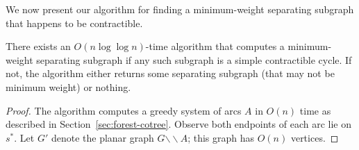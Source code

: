 \documentclass[letterpaper,review]{siamart190516}
\def\snip{\mathbin{\raisebox{0.15ex}{\rotatebox[origin=c]{60}{\Rightscissors}\!}}}
\def\snip{\mathbin{\backslash\!\!\backslash}}
\def\subsnip{\mathbin{\raisebox{0.15ex}{\rotatebox[origin=c]{60}{\footnotesize\Rightscissors}\!}}}
\def\Gsnip{\mathord{G_{\subsnip}}}
\def\Gsnip{G'}
\def\rnote#1{\color{red}Review: #1 \color{black}}
\def\knote#1{\textcolor{olive}{Kyle: #1}}
\begin{document}
{


We now present our algorithm for finding a minimum-weight separating subgraph that happens
to be contractible.
\begin{lemma}
\label{lem:contractible-alg}
There exists an $O(n \log \log n)$-time algorithm that computes a minimum-weight separating subgraph if any such subgraph is a simple contractible cycle. If not, the algorithm either returns some separating subgraph (that may not be minimum weight) or nothing.
\end{lemma}

\begin{proof}

The algorithm computes a greedy system of arcs $A$ in $O(n)$ time as described in
Section~\ref{sec:forest-cotree}.
Observe both endpoints of each arc lie on $s^*$.
Let $\Gsnip$ denote the planar graph $G \snip A$; this graph has $O(n)$ vertices.


\end{proof}}
\end{document}
